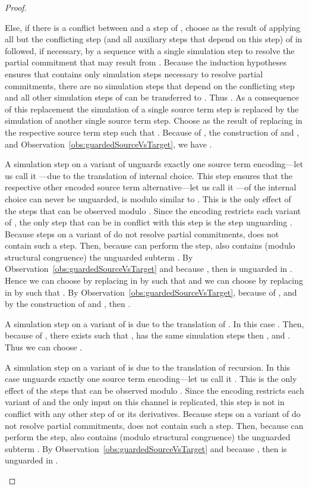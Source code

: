 \documentclass[]{eptcs}
\begin{document}
\begin{proof}
\begin{compactitem}
\begin{compactenum}
					Else, if there is a conflict between  and a step of , choose  as the result of applying all but the conflicting step (and all auxiliary steps that depend on this step) of  in  followed, if necessary, by a sequence with a single simulation step  to resolve the partial commitment that may result from . Because the induction hypotheses ensures that  contains only simulation steps necessary to resolve partial commitments, there are no simulation steps that depend on the conflicting step and all other simulation steps of  can be transferred to . Thus . As a consequence of this replacement the simulation of a single source term step is replaced by the simulation of another single source term step. Choose  as the result of replacing in  the respective source term step such that . Because of , the construction of  and , and Observation~\ref{obs:guardedSourceVsTarget}, we have .
				\item A simulation step  on a variant of  unguards exactly one source term encoding---let us call it ---due to the translation of internal choice. This step ensures that the respective other encoded source term alternative---let us call it ---of the internal choice can never be unguarded, \ie is modulo  similar to . This is the only effect of the steps  that can be observed modulo .
					Since the encoding restricts each variant of , the only step that can be in conflict with this step is the step unguarding . Because steps on a variant of  do not resolve partial commitments,  does not contain such a step. Then, because  can perform the step, also  contains (modulo structural congruence) the unguarded subterm . By Observation~\ref{obs:guardedSourceVsTarget} and because , then  is unguarded in .
					Hence we can choose  by replacing  in  by  such that  and we can choose  by replacing  in  by  such that .
					By Observation~\ref{obs:guardedSourceVsTarget}, because of , and by the construction of  and , then .
				\item A simulation step  on a variant of  is due to the translation of . In this case . Then, because of , there exists  such that ,  has the same simulation steps then , and . Thus we can choose .
				\item A simulation step  on a variant of  is due to the translation of recursion. In this case  unguards exactly one source term encoding---let us call it . This is the only effect of the steps  that can be observed modulo .
					Since the encoding restricts each variant of  and the only input on this channel is replicated, this step is not in conflict with any other step of  or its derivatives. Because steps on a variant of  do not resolve partial commitments,  does not contain such a step. Then, because  can perform the step, also  contains (modulo structural congruence) the unguarded subterm . By Observation~\ref{obs:guardedSourceVsTarget} and because , then  is unguarded in .

\end{compactenum}
\end{compactitem}
\end{proof}
\end{document}
